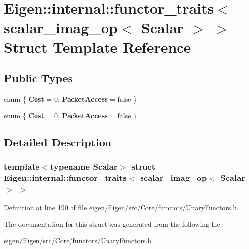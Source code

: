 \hypertarget{struct_eigen_1_1internal_1_1functor__traits_3_01scalar__imag__op_3_01_scalar_01_4_01_4}{}\section{Eigen\+:\+:internal\+:\+:functor\+\_\+traits$<$ scalar\+\_\+imag\+\_\+op$<$ Scalar $>$ $>$ Struct Template Reference}
\label{struct_eigen_1_1internal_1_1functor__traits_3_01scalar__imag__op_3_01_scalar_01_4_01_4}
\subsection*{Public Types}
\begin{DoxyCompactItemize}
\item 
\mbox{\label{struct_eigen_1_1internal_1_1functor__traits_3_01scalar__imag__op_3_01_scalar_01_4_01_4_a6a9690e78ccbd7aa7efce6b444bf606c}} 
enum \{ {\bfseries Cost} = 0, 
{\bfseries Packet\+Access} = false
 \}
\item 
\mbox{\label{struct_eigen_1_1internal_1_1functor__traits_3_01scalar__imag__op_3_01_scalar_01_4_01_4_ad1a755e87cb09ef5d6de09593191560c}} 
enum \{ {\bfseries Cost} = 0, 
{\bfseries Packet\+Access} = false
 \}
\end{DoxyCompactItemize}


\subsection{Detailed Description}
\subsubsection*{template$<$typename Scalar$>$\newline
struct Eigen\+::internal\+::functor\+\_\+traits$<$ scalar\+\_\+imag\+\_\+op$<$ Scalar $>$ $>$}



Definition at line \hyperlink{eigen_2_eigen_2src_2_core_2functors_2_unary_functors_8h_source_l00190}{190} of file \hyperlink{eigen_2_eigen_2src_2_core_2functors_2_unary_functors_8h_source}{eigen/\+Eigen/src/\+Core/functors/\+Unary\+Functors.\+h}.



The documentation for this struct was generated from the following file\+:\begin{DoxyCompactItemize}
\item 
eigen/\+Eigen/src/\+Core/functors/\+Unary\+Functors.\+h\end{DoxyCompactItemize}
